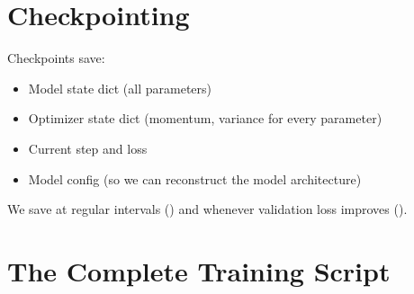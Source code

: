 \section{Checkpointing}

Checkpoints save:
\begin{itemize}
  \item Model state dict (all parameters)
  \item Optimizer state dict (momentum, variance for every parameter)
  \item Current step and loss
  \item Model config (so we can reconstruct the model architecture)
\end{itemize}

We save at regular intervals () and whenever validation loss improves ().


\section{The Complete Training Script}


